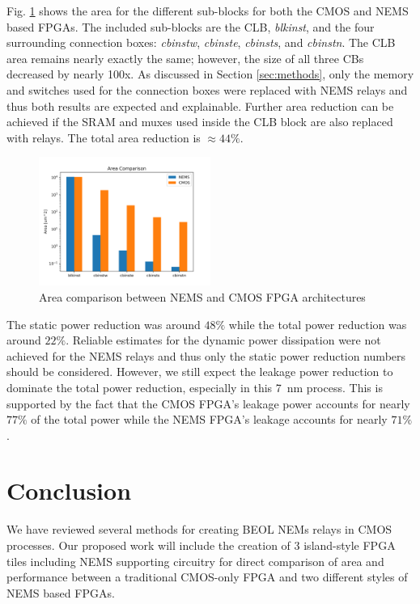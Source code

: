 \documentclass[twoside,twocolumn]{article}
\begin{document}
Fig. \ref{fig:area} shows the area for the different sub-blocks
for both the CMOS and NEMS based FPGAs. The included sub-blocks are the CLB,
\textit{blkinst}, and the four surrounding connection boxes: \textit{cbinstw}, 
\textit{cbinste}, \textit{cbinsts}, and \textit{cbinstn}. The CLB area remains 
nearly exactly the same; however, the size of all three CBs decreased by nearly 
100x. As discussed in Section \ref{sec:methods}, only the memory and switches
used for the connection boxes were replaced with NEMS relays and thus both 
results are expected and explainable. Further area reduction can be achieved
if the SRAM and muxes used inside the CLB block are also replaced with relays.
The total area reduction is $\approx 44\%$. 

\begin{figure}[!hbt]
    \includegraphics[width=0.5\textwidth]{figs/area_comparison.png}
    \centering
    \caption{Area comparison between NEMS and CMOS FPGA architectures}
    \label{fig:area}
\end{figure}

The static power reduction was around $48\%$ while the total power reduction
was around $22\%$. Reliable estimates for the dynamic power dissipation were 
not achieved for the NEMS relays and thus only the static power reduction numbers 
should be considered. However, we still expect the leakage power reduction to dominate 
the total power reduction, especially in this \SI{7}{\nano\meter} process. This is
supported by the fact that the CMOS FPGA's leakage power accounts for nearly $77\%$ 
of the total power while the NEMS FPGA's leakage accounts for nearly $71\%$.

\section{Conclusion}
We have reviewed several methods for creating BEOL NEMs relays in CMOS processes. 
Our proposed work will include the creation of 3 island-style FPGA tiles including NEMS 
supporting circuitry for direct comparison of area and performance between a traditional 
CMOS-only FPGA and two different styles of NEMS based FPGAs.
\end{document}
